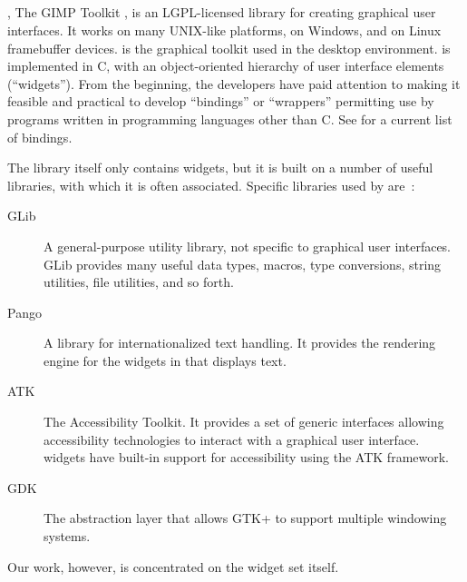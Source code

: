 \documentclass[finalversion]{usetex-v1}
\begin{document}
\subsection{\gtk}
\label{sec:gtk}


\gtk, The GIMP Toolkit \cite{Gtk-webpage:2004}, is an LGPL-licensed
\cite{LGPL:1999} library for creating graphical
user interfaces.  It works on many UNIX-like platforms, on Windows, and
on Linux framebuffer devices.  \gtk is the graphical toolkit used in
the \gnome desktop environment. \gtk is implemented in C, with an object-oriented
hierarchy of user interface elements (``widgets''). From the beginning,
the \gtk developers have paid attention to making it feasible and
practical to develop ``bindings'' or ``wrappers'' permitting
\gtk use by programs written in
programming languages other than C. See
\cite{Gtk-bindings-webpage:2004} for a current list of bindings.

The \gtk library itself only contains widgets, but it is built on a
number of useful libraries, with which it is often
associated. Specific libraries
used by \gtk are~\cite{gtk-reference-manual}:
\begin{description}
\item[GLib] A general-purpose utility library, not specific to
  graphical user interfaces. GLib provides many useful data types,
  macros, type conversions, string utilities, file utilities, and so
  forth.

\item[Pango] A library for internationalized text handling. It
  provides the rendering engine for the widgets in \gtk that displays
  text.

\item[ATK] The Accessibility Toolkit. It provides a set of generic
  interfaces allowing accessibility technologies to interact with a
  graphical user interface.  \gtk widgets have built-in support for
  accessibility using the ATK framework.

\item[GDK] The abstraction layer that allows GTK+ to support multiple
  windowing systems.
\end{description}
Our work, however, is concentrated on the widget set itself.


\end{document}
